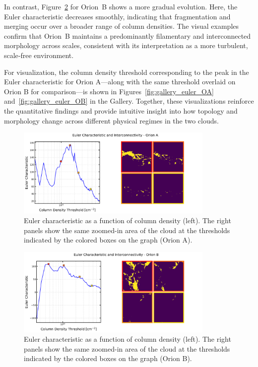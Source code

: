 In contrast, Figure~\ref{fig:Euler_Orion_B} for Orion~B shows a more gradual evolution.  
Here, the Euler characteristic decreases smoothly, indicating that fragmentation and merging occur over a broader range of column densities.  
The visual examples confirm that Orion~B maintains a predominantly filamentary and interconnected morphology across scales, consistent with its interpretation as a more turbulent, scale‑free environment.

For visualization, the column density threshold corresponding to the peak in the Euler characteristic for Orion A—along with the same threshold overlaid on Orion B for comparison—is shown in Figures~\ref{fig:gallery_euler_OA} and~\ref{fig:gallery_euler_OB} in the Gallery.
Together, these visualizations reinforce the quantitative findings and provide intuitive insight into how topology and morphology change across different physical regimes in the two clouds.

\begin{figure}[t]
    \centering
    \includegraphics[width=0.85\textwidth]{figures/euler_Orion_A.png}
    \caption{Euler characteristic as a function of column density (left). The right panels show the same zoomed-in area of the cloud at the thresholds indicated by the colored boxes on the graph (Orion A).}
    \label{fig:Euler_Orion_A}
\end{figure}

\begin{figure}[t]
    \centering
    \includegraphics[width=0.85\textwidth]{figures/euler_Orion_B.png}
    \caption{Euler characteristic as a function of column density (left). The right panels show the same zoomed-in area of the cloud at the thresholds indicated by the colored boxes on the graph (Orion B).}
    \label{fig:Euler_Orion_B}
\end{figure}

